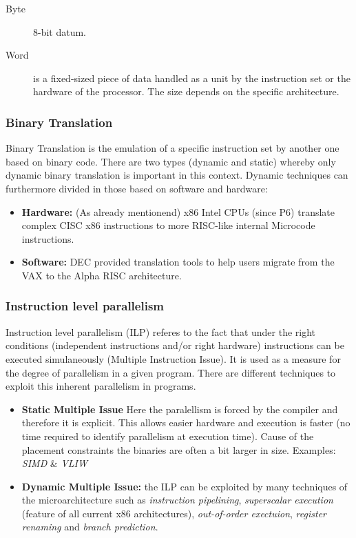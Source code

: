 \documentclass[a4paper,10pt]{article}
\begin{document}
\begin{description}
\item[Byte] 8-bit datum.
\item[Word] is a fixed-sized piece of data handled as a unit by the instruction set or the hardware of the processor. The size depends on the specific architecture.
\end{description}

\subsubsection*{Binary Translation}
Binary Translation is the emulation of a specific instruction set by another one based on binary code. There are two types (dynamic and static) whereby only dynamic binary translation is important in this context. Dynamic techniques can furthermore divided in those based on software and hardware:

\begin{itemize}
\item \textbf{Hardware:} (As already mentionend) x86 Intel CPUs (since P6) translate complex CISC x86 instructions to more RISC-like internal Microcode instructions.
\item \textbf{Software:} DEC provided translation tools to help users migrate from the VAX to the Alpha RISC architecture.
\end{itemize}

\subsubsection*{Instruction level parallelism}
Instruction level parallelism (ILP) referes to the fact that under the right conditions (independent instructions and/or right hardware) instructions can be
executed simulaneously (Multiple Instruction Issue). It is used as a measure for the degree of parallelism in a given program. There are different techniques to
exploit this inherent parallelism in programs.
\begin{itemize}
 \item \textbf{Static Multiple Issue} Here the paralellism is forced by the compiler and therefore it is explicit. This allows easier hardware and execution is faster (no time required to identify parallelism at execution time). Cause of the placement constraints the binaries are often a bit larger in size. Examples: \emph{SIMD} \& \emph{VLIW}

 \item \textbf{Dynamic Multiple Issue:} the ILP can be exploited by many techniques of the microarchitecture such as \emph{instruction pipelining},
 \emph{superscalar execution} (feature of all current x86 architectures), \emph{out-of-order exectuion}, \emph{register renaming} and \emph{branch prediction}.
\end{itemize}
\end{document}
